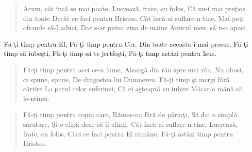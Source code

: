 
\begin{verse}
	Acum, cât încă se mai poate,
	Lucrează, frate, cu folos,
	Că nu-i mai preţios din toate
	Decât ce faci pentru Hristos.
	Cât încă ai suflare-n tine,
	Mai poţi ofrande să-I aduci,
	Dar s-ar putea ziua de mâine
	Amicul meu, să n-o apuci.
\end{verse}

\begin{chorus}
	Fă-ţi timp pentru El,
	Fă-ţi timp pentru Cer,
	Din toate aceasta-i mai presus.
	Fă-ţi timp să iubeşti,
	Fă-ţi timp să te jertfeşti,
	Fă-ţi timp astăzi pentru Isus.
\end{chorus}

\begin{verse}
	Fă-ţi timp pentru acei ce-n lume,
	Aleargă din rău spre mai rău,
	Nu obosi, ci spune, spune,
	De dragostea lui Dumnezeu.
	Fă-ţi timp şi mergi fără cârtire
	La patul celor suferinzi,
	Că ei aşteaptă cu iubire
	Măcar o mână să le-ntinzi.
\end{verse}

\begin{verse}
	Fă-ţi timp pentru copiii care,
	Rămas-au fără de părinţi,
	Să dai o simplă sărutare,
	Şi-o clipă doar să îi alinţi.
	Cât încă ai suflare-n tine,
	Lucrează, frate, cu folos,
	Căci ce faci pentru El rămâne,
	Fă-ţi astăzi timp pentru Hristos.
\end{verse}

\endsong